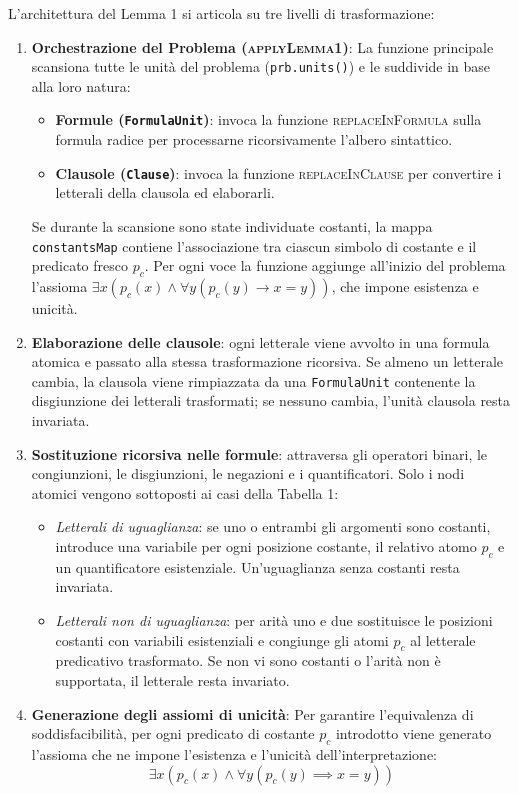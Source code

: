 L'architettura del Lemma 1 si articola su tre livelli di trasformazione:

\begin{enumerate}
    \item \textbf{Orchestrazione del Problema (\textsc{applyLemma1})}:
    La funzione principale scansiona tutte le unità del problema (\texttt{prb.units()}) e le suddivide in base alla loro natura:
    \begin{itemize}
        \item \textbf{Formule (\texttt{FormulaUnit})}: invoca la funzione \textsc{replaceInFormula} sulla formula radice per processarne ricorsivamente l'albero sintattico.
        \item \textbf{Clausole (\texttt{Clause})}: invoca la funzione \textsc{replaceInClause} per convertire i letterali della clausola ed elaborarli.
    \end{itemize}
    Se durante la scansione sono state individuate costanti, la mappa \texttt{constantsMap} contiene l'associazione tra ciascun simbolo di costante e il predicato fresco $p_c$. Per ogni voce la funzione aggiunge all'inizio del problema l'assioma $\exists x(p_c(x)\land\forall y(p_c(y)\to x=y))$, che impone esistenza e unicità.

    \item \textbf{Elaborazione delle clausole}: ogni letterale viene avvolto in una formula atomica e passato alla stessa trasformazione ricorsiva. Se almeno un letterale cambia, la clausola viene rimpiazzata da una \texttt{FormulaUnit} contenente la disgiunzione dei letterali trasformati; se nessuno cambia, l'unità clausola resta invariata.

    \item \textbf{Sostituzione ricorsiva nelle formule}: attraversa gli operatori binari, le congiunzioni, le disgiunzioni, le negazioni e i quantificatori. Solo i nodi atomici vengono sottoposti ai casi della Tabella 1:
    \begin{itemize}
        \item \textit{Letterali di uguaglianza}: se uno o entrambi gli argomenti sono costanti, introduce una variabile per ogni posizione costante, il relativo atomo $p_c$ e un quantificatore esistenziale. Un'uguaglianza senza costanti resta invariata.
        \item \textit{Letterali non di uguaglianza}: per arità uno e due sostituisce le posizioni costanti con variabili esistenziali e congiunge gli atomi $p_c$ al letterale predicativo trasformato. Se non vi sono costanti o l'arità non è supportata, il letterale resta invariato.
    \end{itemize}

    \item \textbf{Generazione degli assiomi di unicità}:
    Per garantire l'equivalenza di soddisfacibilità, per ogni predicato di costante $p_c$ introdotto viene generato l'assioma che ne impone l'esistenza e l'unicità dell'interpretazione:
    $$\exists x \left( p_c(x) \land \forall y (p_c(y) \implies x = y) \right)$$
\end{enumerate}


